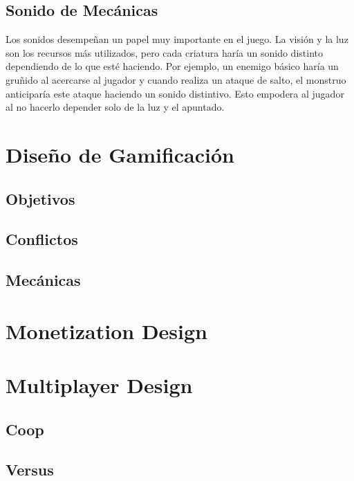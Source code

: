     \subsection{Sonido de Mecánicas}
        Los sonidos desempeñan un papel muy importante en el juego. La visión y la luz son los recursos más utilizados, pero cada criatura haría un sonido distinto dependiendo de lo que esté haciendo. Por ejemplo, un enemigo básico haría un gruñido al acercarse al jugador y cuando realiza un ataque de salto, el monstruo anticiparía este ataque haciendo un sonido distintivo. Esto empodera al jugador al no hacerlo depender solo de la luz y el apuntado.

\section{Diseño de Gamificación}
    \subsection{Objetivos}
    \subsection{Conflictos}
    \subsection{Mecánicas}

\section{Monetization Design}

\section{Multiplayer Design} \label{multiplayer}

    \subsection{Coop}
    \subsection{Versus}


